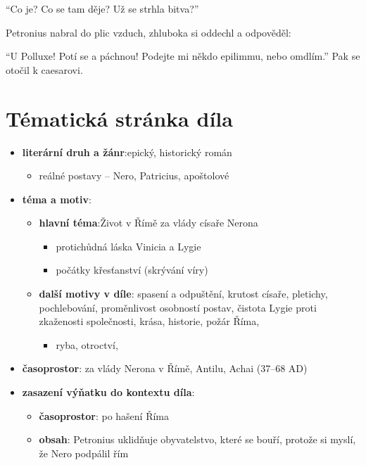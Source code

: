 \documentclass[10pt,a4paper]{article}
\begin{document}
“Co je? Co se tam děje? Už se strhla bitva?”

Petronius nabral do plic vzduch, zhluboka si oddechl a odpověděl:

“U Polluxe! Potí se a páchnou! Podejte mi někdo epilimmu, nebo omdlím.” Pak se otočil k caesarovi.

\newpage
\section*{Tématická stránka díla}
\begin{itemize}
\item \textbf{literární druh a žánr}:epický, historický román
	\begin{itemize}
	\item reálné postavy -- Nero, Patricius, apoštolové
	\end{itemize}
\item \textbf{téma a motiv}: 
	\begin{itemize}
	\item \textbf{hlavní téma}:Život v Římě za vlády císaře Nerona
		\begin{itemize}
		\item protichůdná láska Vinicia a Lygie
		\item počátky křesťanství (skrývání víry)
		\end{itemize}
	\item \textbf{další motivy v díle}: spasení a odpuštění, krutost císaře, pletichy, pochlebování, proměnlivost osobností postav, čistota Lygie proti zkaženosti společnosti, krása, historie, požár Říma, 
		\begin{itemize}
		\item ryba, otroctví, 
		\end{itemize}
	\end{itemize}
\item \textbf{časoprostor}: za vlády Nerona v Římě, Antilu, Achai (37--68 AD)

\item \textbf{zasazení výňatku do kontextu díla}:
	\begin{itemize}
	\item \textbf{časoprostor}: po hašení Říma
	\item \textbf{obsah}: Petronius uklidňuje obyvatelstvo, které se bouří, protože si myslí, že Nero podpálil řím
	\end{itemize}
\end{itemize}
\end{document}
